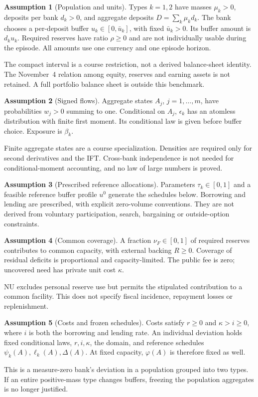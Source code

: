 \documentclass[11pt]{article}
\theoremstyle{definition}
\newtheorem{assumption}{Assumption}
\begin{document}
\begin{assumption}[Population and units]\label{ass:units}
Types $k=1,2$ have masses $\mu_k>0$, deposits per bank $d_k>0$, and aggregate deposits $D=\sum_k\mu_kd_k$. The bank chooses a per-deposit buffer $u_k\in[0,\bar u_k]$, with fixed $\bar u_k>0$. Its buffer amount is $d_ku_k$. Required reserves have ratio $\rho\geq0$ and are not individually usable during the episode. All amounts use one currency and one episode horizon.
\end{assumption}
The compact interval is a course restriction, not a derived balance-sheet identity. The November~4 relation among equity, reserves and earning assets is not retained. A full portfolio balance sheet is outside this benchmark.

\begin{assumption}[Signed flows]\label{ass:flows}
Aggregate states $A_j$, $j=1,\ldots,m$, have probabilities $w_j>0$ summing to one. Conditional on $A_j$, $\epsilon_k$ has an atomless distribution with finite first moment. Its conditional law is given before buffer choice. Exposure is $\beta_k$.
\end{assumption}
Finite aggregate states are a course specialization. Densities are required only for second derivatives and the IFT. Cross-bank independence is not needed for conditional-moment accounting, and no law of large numbers is proved.

\begin{assumption}[Prescribed reference allocations]\label{ass:allocation}
Parameters $\tau_k\in[0,1]$ and a feasible reference buffer profile $u^0$ generate the schedules below. Borrowing and lending are prescribed, with explicit zero-volume conventions. They are not derived from voluntary participation, search, bargaining or outside-option constraints.
\end{assumption}

\begin{assumption}[Common coverage]\label{ass:fund}
A fraction $\nu_F\in[0,1]$ of required reserves contributes to common capacity, with external backing $R\geq0$. Coverage of residual deficits is proportional and capacity-limited. The public fee is zero; uncovered need has private unit cost $\kappa$.
\end{assumption}
NU excludes personal reserve use but permits the stipulated contribution to a common facility. This does not specify fiscal incidence, repayment losses or replenishment.

\begin{assumption}[Costs and frozen schedules]\label{ass:frozen}
Costs satisfy $r\geq0$ and $\kappa>i\geq0$, where $i$ is both the borrowing and lending rate. An individual deviation holds fixed conditional laws, $r,i,\kappa$, the domain, and reference schedules $\psi_k(A),\ell_k(A),\Delta(A)$. At fixed capacity, $\varphi(A)$ is therefore fixed as well.
\end{assumption}
This is a measure-zero bank's deviation in a population grouped into two types. If an entire positive-mass type changes buffers, freezing the population aggregates is no longer justified.
\end{document}
